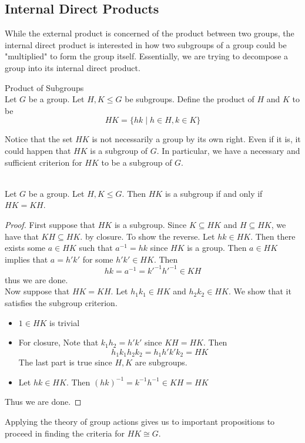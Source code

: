 \documentclass[a4paper]{article}
\begin{document}
\subsection{Internal Direct Products}
While the external product is concerned of the product between two groups, the internal direct product is interested in how two subgroups of a group could be "multiplied" to form the group itself. Essentially, we are trying to decompose a group into its internal direct product. 

\begin{defn}{Product of Subgroups}{}\\
Let $G$ be a group. Let $H,K\leq G$ be subgroups. Define the product of $H$ and $K$ to be $$HK=\{hk\;|\;h\in H,k\in K\}$$
\end{defn}

Notice that the set $HK$ is not necessarily a group by its own right. Even if it is, it could happen that $HK$ is a subgroup of $G$. In particular, we have a necessary and sufficient criterion for $HK$ to be a subgroup of $G$. 

\begin{prp}{}{}\\
Let $G$ be a group. Let $H,K\leq G$. Then $HK$ is a subgroup if and only if $HK=KH$. 
\begin{proof}
First suppose that $HK$ is a subgroup. Since $K\subseteq HK$ and $H\subseteq HK$, we have that $KH\subseteq HK$. by closure. To show the reverse. Let $hk\in HK$. Then there exists some $a\in HK$ such that $a^{-1}=hk$ since $HK$ is a group. Then $a\in HK$ implies that $a=h'k'$ for some $h'k'\in HK$. Then $$hk=a^{-1}=k'^{-1}h'^{-1}\in KH$$ thus we are done. \\
Now suppose that $HK=KH$. Let $h_1k_1\in HK$ and $h_2k_2\in HK$. We show that it satisfies the subgroup criterion. 
\begin{itemize}
\item $1\in HK$ is trivial
\item For closure, Note that $k_1h_2=h'k'$ since $KH=HK$. Then $$h_1k_1h_2k_2=h_1h'k'k_2=HK$$ The last part is true since $H,K$ are subgroups. 
\item Let $hk\in HK$. Then $(hk)^{-1}=k^{-1}h^{-1}\in KH=HK$
\end{itemize}
Thus we are done. 
\end{proof}
\end{prp}

Applying the theory of group actions gives us to important propositions to proceed in finding the criteria for $HK\cong G$. 
\end{document}
